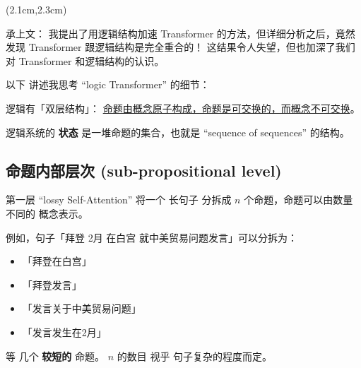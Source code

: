 \begin{preview}

\cc{
\title{\vspace{-1.5cm} \bfseries\color{blue}{\LARGE Transformer = 逻辑 Transformer}}
}{
\title{\vspace{-1.5cm} \bfseries\color{blue}{\LARGE Transformer = Logic Transformer}}
}

\date{\vspace{-2cm}} %

\maketitle

\setcounter{section}{-1}

\begin{textblock*}{5cm}(2.1cm,2.3cm) %
{}
\end{textblock*}

\begin{minipage}{\textwidth}
\setlength{\parskip}{0.4\baselineskip}

承上文： 我提出了用逻辑结构加速 Transformer 的方法，但详细分析之后，竟然发现 Transformer 跟逻辑结构是完全重合的！ 这结果令人失望，但也加深了我们对 Transformer 和逻辑结构的认识。

以下 讲述我思考 ``logic Transformer'' 的细节：

逻辑有「双层结构」： \uline{命题由概念原子构成，命题是可交换的，而概念不可交换}。 

逻辑系统的 \textbf{状态} 是一堆命题的集合，也就是 ``sequence of sequences'' 的结构。 


\subsection{命题内部层次 (sub-propositional level)}

第一层 ``lossy Self-Attention'' 将一个 长句子 分拆成 $n$ 个命题，命题可以由数量不同的 概念表示。 

例如，句子「拜登 2月 在白宫 就中美贸易问题发言」可以分拆为：
\begin{itemize}
	\item 「拜登在白宫」
	\item 「拜登发言」
	\item 「发言关于中美贸易问题」
	\item 「发言发生在2月」
\end{itemize}
等 几个 \textbf{较短的} 命题。 $n$ 的数目 视乎 句子复杂的程度而定。


\end{minipage}
\end{preview}
